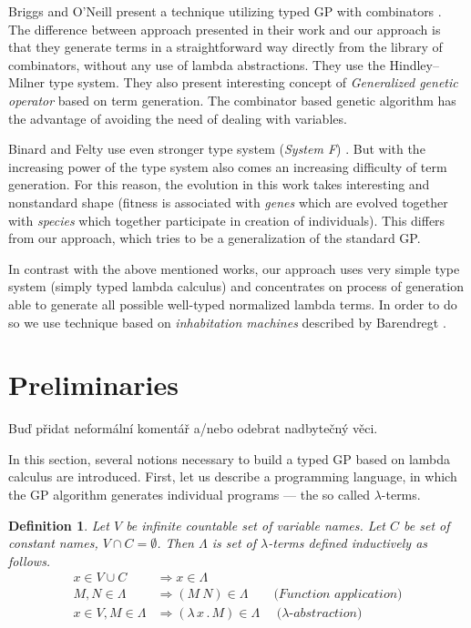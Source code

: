 \documentclass{sig-alternate}
\newtheorem{definition}{Definition}
\newcommand{\lets}{let us\xspace}
\newcommand{\lterms}{$\lambda$-terms\xspace}
\newcommand{\then}{\Rightarrow\xspace}
\newcommand{\lamb}[2]{( \lambda \, #1 \, . \, #2 )}
\newcommand{\red}[1]{{\color{red} #1}}
\begin{document}
Briggs and O’Neill present a technique 
utilizing typed GP with combinators \cite{kes}.
The difference between approach presented in their work
and our approach is that they generate terms in a straightforward way directly from the library of combinators, without any use of lambda abstractions. They use the Hindley–Milner type system. They also present interesting concept of \textit{Generalized genetic operator} based on term generation. The combinator based genetic algorithm has the advantage of
avoiding the need of dealing with variables.

Binard and Felty use even stronger type system (\textit{System F}) \cite{binard2008genetic}. But with the increasing power of the type system also comes an increasing difficulty of term generation. For this reason, the evolution in this work takes interesting and nonstandard shape (fitness is associated with \textit{genes} which are evolved together with \textit{species} which together participate in creation of individuals). This differs from our approach, which tries to be a generalization of the standard GP\cite{koza92}.

In contrast with the above mentioned works, our approach uses very simple type system (simply typed lambda calculus) and concentrates on process of generation  
able to generate all possible well-typed normalized lambda terms. In order to do so we use technique based on \textit{inhabitation machines} described by Barendregt \cite{barendregt10}.    

\section{Preliminaries}
\label{preliminaries}

\red{Buď přidat neformální komentář a/nebo odebrat nadbytečný věci.}

In this section, several notions necessary to build a typed GP based on lambda calculus are introduced. 
First, \lets describe a programming language, 
in which the GP algorithm generates individual programs --- the so called \lterms.

\begin{definition}
Let $V$ be infinite countable set of {\it 
variable names}. Let $C$ be set of {\it constant names}, 
$V \cap C = \emptyset$.	 	
Then $\Lambda$ is set of {\it \lterms} defined inductively as follows.	
\begin{align*}
x   \in V \cup C  &\then x     \in \Lambda \\
M,N \in \Lambda   &\then (M~N) \in \Lambda 
\textit{~~~~~~(Function application)} \\
x   \in V , M \in \Lambda &\then \lamb{x}{M} \in \Lambda
\textit{~~~~($\lambda$-abstraction)} 
\end{align*}
\end{definition}
\end{document}
